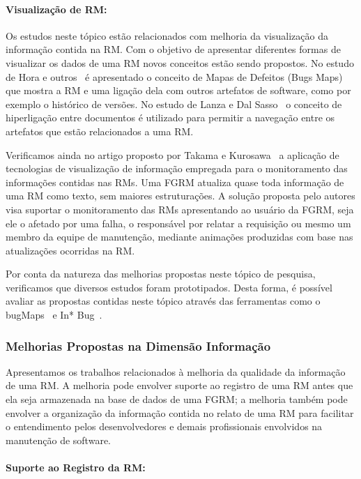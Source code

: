 \paragraph{Visualização de RM:} Os estudos neste tópico estão relacionados com
melhoria da visualização da informação contida na RM\@. Com o objetivo de
apresentar diferentes formas de visualizar os dados de uma RM novos conceitos
estão sendo propostos. No estudo de Hora e outros~\cite{hora2012bug} é
apresentado o conceito de Mapas de Defeitos (Bugs Maps) que mostra a RM e uma
ligação dela com outros artefatos de software, como por exemplo o histórico de
versões.  No estudo de Lanza e  Dal Sasso~\cite{dal2014bug} o conceito de
hiperligação entre documentos é utilizado para permitir a navegação entre os
artefatos que estão relacionados a uma RM\@.

Verificamos ainda no artigo proposto por Takama e
Kurosawa~\cite{takama2013application} a aplicação de tecnologias de visualização
de informação empregada para o monitoramento das informações contidas nas RMs.
Uma FGRM atualiza quase toda informação de uma RM como texto, sem maiores
estruturações. A solução proposta pelo autores visa suportar o monitoramento das
RMs apresentando ao usuário da FGRM, seja ele o afetado por uma falha, o
responsável por relatar a requisição ou mesmo um membro da equipe de manutenção,
mediante animações produzidas com base nas atualizações ocorridas na RM\@.

Por conta da natureza das melhorias propostas neste tópico de pesquisa,
verificamos que diversos estudos foram prototipados. Desta forma, é possível
avaliar as propostas contidas neste tópico através das ferramentas como o
bugMaps~\cite{hora2012bug} e In* Bug~\cite{dal2014bug}.

\subsubsection{Melhorias Propostas na Dimensão Informação}
\label{ssub:melhorias_dim_informacao}

Apresentamos os trabalhos relacionados à melhoria da qualidade da informação de
uma RM\@. A melhoria pode envolver suporte ao registro de uma RM antes que ela
seja armazenada na base de dados de uma FGRM\@; a melhoria também pode envolver
a organização da informação contida no relato de uma RM para facilitar o
entendimento pelos desenvolvedores e demais profissionais envolvidos na
manutenção de software.

\paragraph{Suporte ao Registro da RM:}

